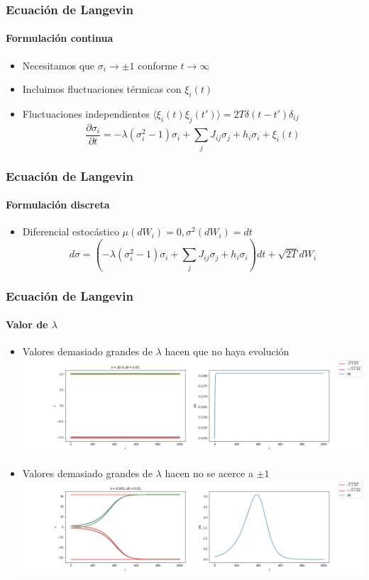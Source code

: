 \documentclass[11pt]{beamer}
\begin{document}
\begin{frame}
\frametitle{Ecuación de Langevin}
\framesubtitle{Formulación continua}
\begin{itemize}
	\item Necesitamos que $\sigma_i \rightarrow \pm 1$ conforme $t \rightarrow \infty$
	\item Incluimos fluctuaciones térmicas con $\xi_i(t)$
	\item Fluctuaciones independientes $\langle \xi_i(t) \xi_j(t') \rangle = 2T\delta(t-t')\delta_{ij}$
	\begin{displaymath}
	\frac{\partial\sigma_i}{\partial t} = -\lambda(\sigma_i^2-1)\sigma_i + \sum_j J_{ij}\sigma_j + h_i\sigma_i + \xi_i(t)
	\end{displaymath}	
\end{itemize}
\end{frame}
\begin{frame}
\frametitle{Ecuación de Langevin}
\framesubtitle{Formulación discreta}
\begin{itemize}
	\item Diferencial estocástico $\mu(dW_i) = 0, \sigma^2(dW_i) = dt$
	\begin{displaymath}
	d\sigma = \left( -\lambda(\sigma_i^2 - 1)\sigma_i +  \sum_j J_{ij} \sigma_j + h_i\sigma_i \right) dt + \sqrt{2T}dW_i
	\end{displaymath}	
\end{itemize}
\end{frame}

\begin{frame}
\frametitle{Ecuación de Langevin}
\framesubtitle{Valor de $\lambda$}
\begin{itemize}
	\item Valores demasiado grandes de $\lambda$ hacen que no haya evolución
	\includegraphics[width=\linewidth]{Sobreamortiguado.png}
	\item Valores demasiado grandes de $\lambda$ hacen no se acerce a $\pm 1$
	\includegraphics[width=\linewidth]{Subamortiguado.png}
\end{itemize}
\end{frame}
\end{document}
